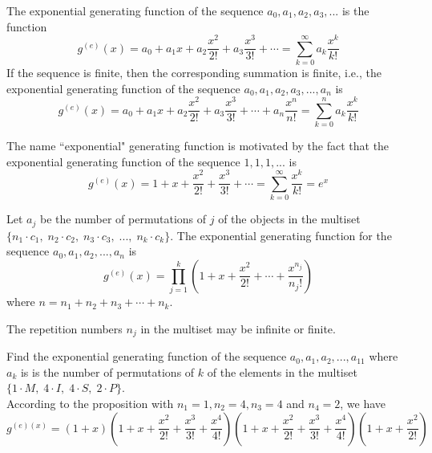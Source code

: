 \documentclass[handout]{ximera}
\begin{document}
\begin{definition}
The exponential generating function of the sequence $a_0, a_1, a_2, a_3, ...$ is the function
\[
g^{(e)}(x) = a_0 + a_1x + a_2\frac{x^2}{2!} + a_3\frac{x^3}{3!} + \cdots = \sum_{k=0}^\infty a_k \frac{x^k}{k!}
\]
If the sequence is finite, then the corresponding summation is finite, i.e., the exponential generating function of the sequence
$a_0, a_1, a_2, a_3, ..., a_n$ is
\[
g^{(e)}(x) = a_0 + a_1x + a_2\frac{x^2}{2!} + a_3\frac{x^3}{3!} + \cdots  + a_n\frac{x^n}{n!} = \sum_{k=0}^n a_k \frac{x^k}{k!}
\]
\end{definition}

\begin{remark} The name ``exponential" generating function is motivated by the fact that the exponential 
generating function of the sequence $1, 1, 1, ...$ is
\[
g^{(e)}(x) = 1 + x + \frac{x^2}{2!} + \frac{x^3}{3!} + \cdots = \sum_{k=0}^\infty \frac{x^k}{k!} = e^x
\]
\end{remark}

\begin{proposition}
Let $a_j$ be the number of permutations of $j$ of the objects in the 
multiset $\{n_1 \cdot c_1,\; n_2 \cdot c_2,\; n_3 \cdot c_3, \;...,\; n_k \cdot c_k\}$.
The exponential generating function for the sequence $a_0, a_1, a_2, ..., a_n$ 
is 
\[
g^{(e)}(x) = \prod_{j=1}^k \left(1 + x + \frac{x^2}{2!} + \cdots + \frac{x^{n_j}}{n_j !}\right)
\]
where $n = n_1 + n_2 + n_3 + \cdots + n_k$.
\end{proposition}
\begin{remark}
The repetition numbers $n_j$ in the multiset may be infinite or finite.
\end{remark}

\begin{example}[example 1] 
Find the exponential generating function of the sequence $a_0, a_1, a_2, ..., a_{11}$ where $a_k$ is is the number of 
permutations of $k$ of the elements in the multiset $\{1\cdot M,\; 4\cdot I,\; 4\cdot S,\; 2\cdot P\}$.\\
According to the proposition with $n_1 = 1, n_2 = 4, n_3 = 4$ and $n_4 = 2$, we have
\[
g^{(e)(x)} = \left(1+x\right)\left(1+x+\frac{x^2}{2!} + \frac{x^3}{3!} + \frac{x^4}{4!}\right)
\left(1+x+\frac{x^2}{2!} + \frac{x^3}{3!} + \frac{x^4}{4!}\right)
\left(1+x+\frac{x^2}{2!}\right)
\]
\end{example}
\end{document}
